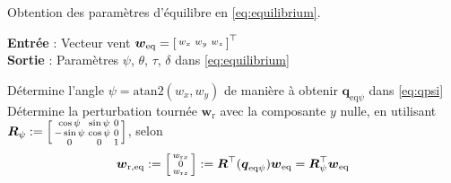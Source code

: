     \begin{algorithm}
    \caption{Obtention des paramètres d'équilibre en \eqref{eq:equilibrium}.}
    \label{alg:eq}
    \hspace*{.1cm} \textbf{Entrée} : Vecteur vent $\boldsymbol{w}_{\text{eq}} =\left[ \begin{smallmatrix}w_x & w_y & w_z \end{smallmatrix} \right]^\top$ \\
    \hspace*{.1cm} \textbf{Sortie} : Paramètres $\psi$, $\theta$, $\tau$, $\delta$ dans \eqref{eq:equilibrium}
    \begin{algorithmic}[1]
        \State Détermine l'angle $\psi = \text{atan2}(w_x, w_y)$ de manière à obtenir $\boldsymbol{q}_{\mathrm{eq}\psi}$ dans \eqref{eq:qpsi}  
        \State Détermine la perturbation tournée $\boldsymbol{w}_{\text{r}}$ avec la composante $y$ nulle, en utilisant $\boldsymbol{R}_{\psi}:= \left[ \begin{smallmatrix} \cos \psi & \sin \psi & 0 \\ -\sin \psi & \cos \psi & 0 \\ 0 & 0 & 1  \end{smallmatrix} \right]$, selon
        \begin{align}
        \label{eq:wh}
        \boldsymbol{w}_{\mathrm{r,eq}} := \left[ \begin{smallmatrix}w_{\text{r}x} \\ 0 \\w_{\text{r}z} \end{smallmatrix} \right] :=  \boldsymbol{R}^\top(\boldsymbol{q}_{\mathrm{eq}\psi}) \boldsymbol{w}_{\mathrm{eq}} = \boldsymbol{R}^\top_{\psi} \boldsymbol{w}_{\mathrm{eq}}
        \end{align}


\end{algorithmic}
\end{algorithm}
